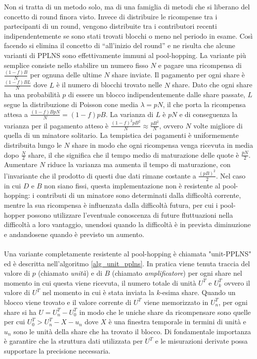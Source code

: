 Non si tratta di un metodo solo, ma di una famiglia di metodi che si liberano del concetto di round finora visto.
Invece di distribuire le ricompense tra i partecipanti di un round, vengono distribuite tra i contributori recenti indipendentemente se sono stati trovati blocchi o meno nel periodo in esame. Così facendo si elimina il concetto di ``all'inizio del round'' e ne risulta che alcune varianti di PPLNS sono effettivamente immuni al pool-hopping.
La variante più semplice consiste nello stabilire un numero fisso $N$ e pagare una ricompensa di $\frac{(1-f)B}{N}$ per ognuna delle ultime $N$ share inviate. Il pagamento per ogni share è $\frac{(1-f)BL}{N}$ dove $L$ è il numero di blocchi trovato nelle $N$ share. Dato che ogni share ha una probabilità $p$ di essere un blocco indipendentemente dalle share passate, $L$ segue la distribuzione di Poisson cone media $\lambda = pN$, il che porta la ricompensa attesa a $\frac{(1-f)BpN}{N} = (1-f)pB$. La varianza di $L$ è $pN$ e di conseguenza la varianza per il pagamento atteso è $\frac{(1-f)^2 pB^2}{N} \approx \frac{pB^2}{N}$, ovvero $N$ volte migliore di quella di un minatore solitario.
La tempistica dei pagamenti è uniformemente distribuita lungo le $N$ share in modo che ogni ricompensa venga ricevuta in media dopo $\frac{N}{2}$ share, il che significa che il tempo medio di maturazione delle quote è $\frac{pN}{2}$. Aumentare $N$ riduce la varianza ma aumenta il tempo di maturazione, con l'invariante che il prodotto di questi due dati rimane costante a $\frac{(pB)^2}{2}$.
Nel caso in cui $D$ e $B$ non siano fissi, questa implementazione non è resistente al pool-hopping: i contributi di un minatore sono determinati dalla difficoltà corrente, mentre la sua ricompensa è influenzata dalla difficoltà futura, per cui i pool-hopper possono utilizzare l'eventuale conoscenza di future fluttuazioni nella difficoltà a loro vantaggio, unendosi quando la difficoltà è in prevista diminuzione e andandosene quando è previsto un aumento.\\\\
Una variante completamente resistente al pool-hopping è chiamata "unit-PPLNS" ed è descritta nell'algoritmo \ref{alg_unit_pplns}. In pratica viene tenuta traccia del valore di $p$ (chiamato \emph{unità}) e di $B$ (chiamato \emph{amplificatore}) per ogni share nel momento in cui questa viene ricevuta, il numero totale di unità $U^T$ e $U^T_k$ ovvero il valore di $U^T$ nel momento in cui è stata inviata la $k$-esima share.
Quando un blocco viene trovato e il valore corrente di $U^T$ viene memorizzato in $U^T_n$, per ogni share si ha $U=U^T_n - U^T_0$ in modo che le uniche share da ricompensare sono quelle per cui $U^T_0 > U^T_n - X -u_n$ dove $X$ è una finestra temporale in termini di unità e $u_n$ sono le unità della share che ha trovato il blocco. Di fondamentale importanza è garantire che la struttura dati utilizzata per $U^T$ e le misurazioni derivate possa supportare la precisione necessaria.
